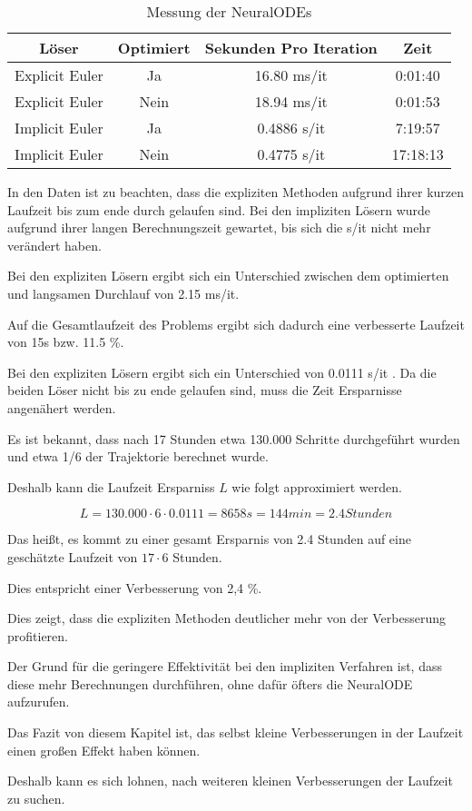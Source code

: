 \begin{table}[h!]
\centering
    \begin{tabular}{c|c|c|c}
         Löser & Optimiert & Sekunden Pro Iteration & Zeit \\
         \hline
         Explicit Euler & Ja & 16.80 ms/it & 0:01:40 \\
         Explicit Euler & Nein & 18.94 ms/it & 0:01:53 \\
         Implicit Euler & Ja & 0.4886 s/it & 7:19:57 \\
         Implicit Euler & Nein &  0.4775 s/it & 17:18:13 \\
    \end{tabular}
    \label{table:langzeitMessung}
    \caption{Messung der NeuralODEs}
\end{table}
In den Daten ist zu beachten, dass die expliziten Methoden aufgrund ihrer kurzen Laufzeit bis zum ende durch gelaufen sind.
Bei den impliziten Lösern wurde aufgrund ihrer langen Berechnungszeit gewartet, bis sich die s/it nicht mehr verändert haben.

Bei den expliziten Lösern ergibt sich ein Unterschied zwischen dem optimierten und langsamen Durchlauf von 2.15 ms/it.

Auf die Gesamtlaufzeit des Problems ergibt sich dadurch eine verbesserte Laufzeit von 15s bzw. 11.5 \%.

Bei den expliziten Lösern ergibt sich ein Unterschied von 0.0111 s/it .
Da die beiden Löser nicht bis zu ende gelaufen sind, muss die Zeit Ersparnisse angenähert werden.

Es ist bekannt, dass nach 17 Stunden etwa 130.000 Schritte durchgeführt wurden und etwa 1/6 der Trajektorie berechnet wurde.

Deshalb kann die Laufzeit Ersparniss $L$ wie folgt approximiert werden.

$$
L = 130.000 \cdot 6 \cdot 0.0111 = 8658s = 144 min = 2.4 Stunden 
$$

Das heißt, es kommt zu einer gesamt Ersparnis von 2.4 Stunden auf eine geschätzte Laufzeit von $17 \cdot 6 $ Stunden.

Dies entspricht einer Verbesserung von 2,4 \%.

Dies zeigt, dass die expliziten Methoden deutlicher mehr von der Verbesserung profitieren.

Der Grund für die geringere Effektivität bei den impliziten Verfahren ist, dass diese mehr Berechnungen durchführen, ohne dafür öfters 
die NeuralODE aufzurufen.

Das Fazit von diesem Kapitel ist, das selbst kleine Verbesserungen in der Laufzeit einen großen Effekt haben können.

Deshalb kann es sich lohnen, nach weiteren kleinen Verbesserungen der Laufzeit zu suchen.



